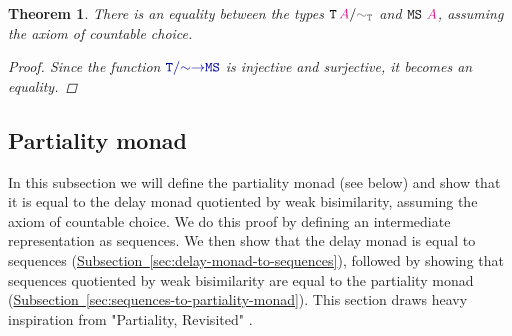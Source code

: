\documentclass[twoside,11pt,openright]{report}
\theoremstyle{plain} %
\newtheorem{thm}{Theorem}[section]
\theoremstyle{definition}
\theoremstyle{remark}
\newcommand*{\subsectionref}[1]{\hyperref[sec:#1]{Subsection~\ref*{sec:#1}}}
\newcommand*{\type}[1]{\textcolor{magenta!90!black}{#1}}
\newcommand*{\relation}[1]{\textcolor{gray!75!black}{\ensuremath{\mathtt{#1}}}}
\newcommand*{\function}[1]{\textcolor{blue!60!black}{\ensuremath{\mathtt{#1}}}}
\newcommand*{\typeformer}[1]{\ensuremath{\mathtt{#1}}}
\begin{document}
\begin{thm}
  \label{thm:QM-QIIT-eq-multiset}
  There is an equality between the types \(\typeformer{T}\,\type{A}/\relation{\sim_{T}}\) and \(\typeformer{MS}~\type{A}\), assuming the axiom of countable choice.
  \begin{proof}
    Since the function \(\function{T/{\sim}{\rightarrow}MS}\) is injective and surjective, it becomes an equality.
  \end{proof}
\end{thm}

\subsection{Partiality monad}
In this subsection we will define the partiality monad (see below) and show that it is equal to the delay monad quotiented by weak bisimilarity, assuming the axiom of countable choice. We do this proof by defining an intermediate representation as sequences. We then show that the delay monad is equal to sequences (\subsectionref{delay-monad-to-sequences}), followed by showing that sequences quotiented by weak bisimilarity are equal to the partiality monad (\subsectionref{sequences-to-partiality-monad}). This section draws heavy inspiration from "Partiality, Revisited" \cite{Partiality-Revisited}.
\end{document}
